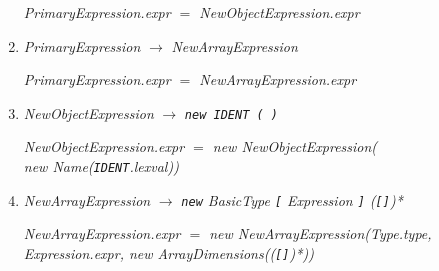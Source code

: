 \documentclass[12pt,a4paper]{scrartcl}
\renewcommand{\prod}[2]{\textit{#1} $\rightarrow$ \textit{#2}}
\newcommand{\tok}[1]{\textnormal{\texttt{#1}}}
\newcommand{\assign}[2]{\textit{#1} $=$ #2}
\newcommand{\new}[2]{\textnormal{new #1(\textit{#2})}}
\newcommand{\attr}[1]{\parbox{\linewidth}{\raggedleft \textit{#1}}}
\begin{document}
\begin{enumerate}
        \attr{\assign{PrimaryExpression.expr}{NewObjectExpression.expr}}
    \item \prod{PrimaryExpression}{NewArrayExpression}\\
        \attr{\assign{PrimaryExpression.expr}{NewArrayExpression.expr}}
    \item \prod{NewObjectExpression}{\tok{new IDENT ( )}}\\
        \attr{\assign{NewObjectExpression.expr}{\new{NewObjectExpression}{\\\new{Name}{\tok{IDENT}.lexval}}}}
    \item \prod{NewArrayExpression}{\tok{new} BasicType \tok{[} Expression \tok{]} (\tok{[]})*}\\
        \attr{\assign{NewArrayExpression.expr}{\new{NewArrayExpression}{Type.type, Expression.expr, \new{ArrayDimensions}{(\tok{[]})*}}}}
\end{enumerate}
\end{document}

